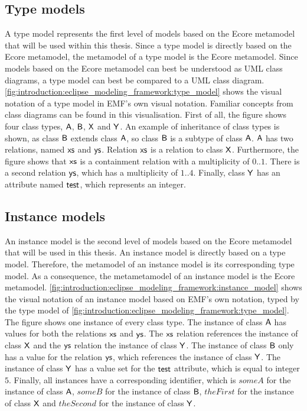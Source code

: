 \subsection{Type models}
\label{subsec:introduction:eclipse_modeling_framework:type_models}
A type model represents the first level of models based on the Ecore metamodel that will be used within this thesis. Since a type model is directly based on the Ecore metamodel, the metamodel of a type model is the Ecore metamodel. Since models based on the Ecore metamodel can best be understood as UML class diagrams, a type model can best be compared to a UML class diagram. \cref{fig:introduction:eclipse_modeling_framework:type_model} shows the visual notation of a type model in EMF's own visual notation. Familiar concepts from class diagrams can be found in this visualisation. First of all, the figure shows four class types, $\mathsf{A}$, $\mathsf{B}$, $\mathsf{X}$ and $\mathsf{Y}$. An example of inheritance of class types is shown, as class $\mathsf{B}$ extends class $\mathsf{A}$, so class $\mathsf{B}$ is a subtype of class $\mathsf{A}$. $\mathsf{A}$ has two relations, named $\mathsf{xs}$ and $\mathsf{ys}$. Relation $\mathsf{xs}$ is a relation to class $\mathsf{X}$. Furthermore, the figure shows that $\mathsf{xs}$ is a containment relation with a multiplicity of $0..1$. There is a second relation $\mathsf{ys}$, which has a multiplicity of $1..4$. Finally, class $\mathsf{Y}$ has an attribute named $\mathsf{test}$, which represents an integer.

\subsection{Instance models}
\label{subsec:introduction:eclipse_modeling_framework:instance_models}
An instance model is the second level of models based on the Ecore metamodel that will be used in this thesis. An instance model is directly based on a type model. Therefore, the metamodel of an instance model is its corresponding type model. As a consequence, the metametamodel of an instance model is the Ecore metamodel. \cref{fig:introduction:eclipse_modeling_framework:instance_model} shows the visual notation of an instance model based on EMF's own notation, typed by the type model of \cref{fig:introduction:eclipse_modeling_framework:type_model}. The figure shows one instance of every class type. The instance of class $\mathsf{A}$ has values for both the relations $\mathsf{xs}$ and $\mathsf{ys}$. The $\mathsf{xs}$ relation references the instance of class $\mathsf{X}$ and the $\mathsf{ys}$ relation the instance of class $\mathsf{Y}$. The instance of class $\mathsf{B}$ only has a value for the relation $\mathsf{ys}$, which references the instance of class $\mathsf{Y}$. The instance of class $\mathsf{Y}$ has a value set for the $\mathsf{test}$ attribute, which is equal to integer $5$. Finally, all instances have a corresponding identifier, which is $someA$ for the instance of class $\mathsf{A}$, $someB$ for the instance of class $\mathsf{B}$, $theFirst$ for the instance of class $\mathsf{X}$ and $theSecond$ for the instance of class $\mathsf{Y}$.